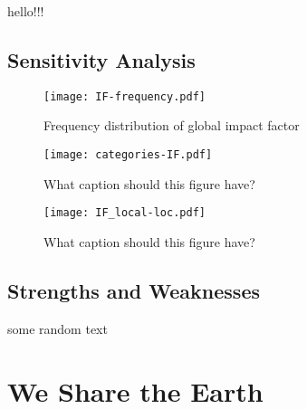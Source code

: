 \documentclass[12pt]{article}
\begin{document}
		hello!!! \\

	\subsection{Sensitivity Analysis}
	
		\begin{figure}
			\centering
			\texttt{[image: IF-frequency.pdf]}
			\caption{Frequency distribution of global impact factor}
			\label{fig:freqIF}
		\end{figure}
	
		\begin{figure}
			\centering
			\texttt{[image: categories-IF.pdf]}
			\caption{What caption should this figure have?}
			\label{fig:IFfactors}
		\end{figure}
		
		\begin{figure}
			\centering
			\texttt{[image: IF\_local-loc.pdf]}
			\caption{What caption should this figure have?}
			\label{fig:IFLocal}
		\end{figure}
		
	\subsection{Strengths and Weaknesses}

		some random text
	
\section*{We Share the Earth}



\newrefcontext
\printbibliography
\end{document}
